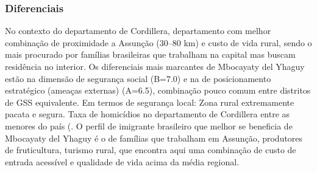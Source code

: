 \subsubsection*{Diferenciais}\label{dif-mbocayaty-del-yhaguy-0312}
No contexto do departamento de Cordillera, departamento com melhor combinação de proximidade a Assunção (30–80 km) e custo de vida rural, sendo o mais procurado por famílias brasileiras que trabalham na capital mas buscam residência no interior. Os diferenciais mais marcantes de Mbocayaty del Yhaguy estão na dimensão de segurança social (B=7.0) e na de posicionamento estratégico (ameaças externas) (A=6.5), combinação pouco comum entre distritos de GSS equivalente. Em termos de segurança local: Zona rural extremamente pacata e segura. Taxa de homicídios no departamento de Cordillera entre as menores do país (. O perfil de imigrante brasileiro que melhor se beneficia de Mbocayaty del Yhaguy é o de famílias que trabalham em Assunção, produtores de fruticultura, turismo rural, que encontra aqui uma combinação de custo de entrada acessível e qualidade de vida acima da média regional.
